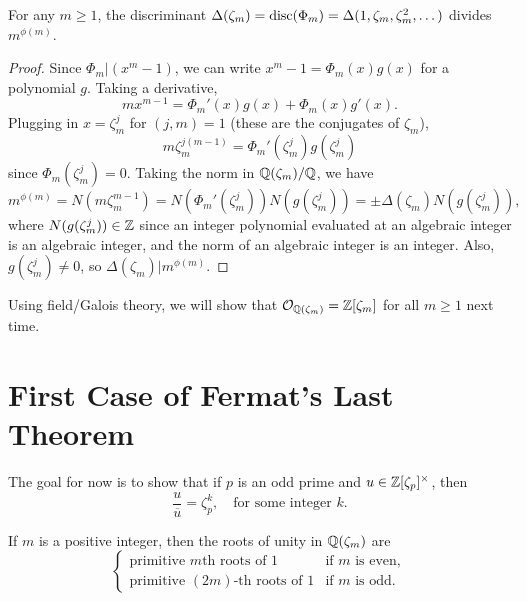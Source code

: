 \begin{lemma}
  For any $m \ge 1$, the
  discriminant $\Delta(\zeta_m) = \operatorname{disc}(\Phi_m) = \Delta(1, \zeta_m, \zeta_m^2, \dots)$
  divides $m^{\phi(m)}$.
\end{lemma}

\begin{proof}
  Since $\Phi_m | (x^m - 1)$, we can write
  $x^m - 1 = \Phi_m(x) g(x)$ for a polynomial $g$.
  Taking
  a derivative,
  \[
    mx^{m - 1} = \Phi_m'(x) g(x) + \Phi_m(x) g'(x).
  \]
  Plugging in $x = \zeta_m^j$ for $(j, m) = 1$ (these
  are the conjugates of $\zeta_m$),
  \[
    m\zeta_m^{j(m - 1)} = \Phi_m'(\zeta_m^j) g(\zeta_m^j)
  \]
  since $\Phi_m(\zeta_m^j) = 0$. Taking the norm in
  $\mathbb{Q}(\zeta_m) / \mathbb{Q}$, we have
  \[
    m^{\phi(m)}
    = N(m \zeta_m^{m - 1})
    = N(\Phi_m'(\zeta_m^j)) N(g(\zeta_m^j))
    = \pm \Delta(\zeta_m) N(g(\zeta_m^j)),
  \]
  where $N(g(\zeta_m^j)) \in \mathbb{Z}$
  since an integer polynomial evaluated at an algebraic
  integer is an algebraic integer, and the norm of
  an algebraic integer is an integer. Also,
  $g(\zeta_m^j) \ne 0$, so $\Delta(\zeta_m) | m^{\phi(m)}$.
\end{proof}

\begin{remark}
  Using field/Galois theory, we will show
  that $\mathcal{O}_{\mathbb{Q}(\zeta_m)} = \mathbb{Z}[\zeta_m]$
  for all $m \ge 1$ next time.
\end{remark}

\section{First Case of Fermat's Last Theorem}

\begin{remark}
  The goal for now is to show that if
  $p$ is an odd prime and $u \in \mathbb{Z}[\zeta_p]^\times$,
  then
  \[
    \frac{u}{\overline{u}} = \zeta_p^k, \quad
    \text{for some integer $k$}.
  \]
\end{remark}

\begin{lemma}
  If $m$ is a positive integer, then the roots
  of unity in $\mathbb{Q}(\zeta_m)$ are
  \[
    \begin{cases}
      \text{primitive $m$th roots of $1$} & \text{if $m$ is even}, \\
      \text{primitive $(2m)$-th roots of $1$} & \text{if $m$ is odd}.
    \end{cases}
  \]
\end{lemma}


